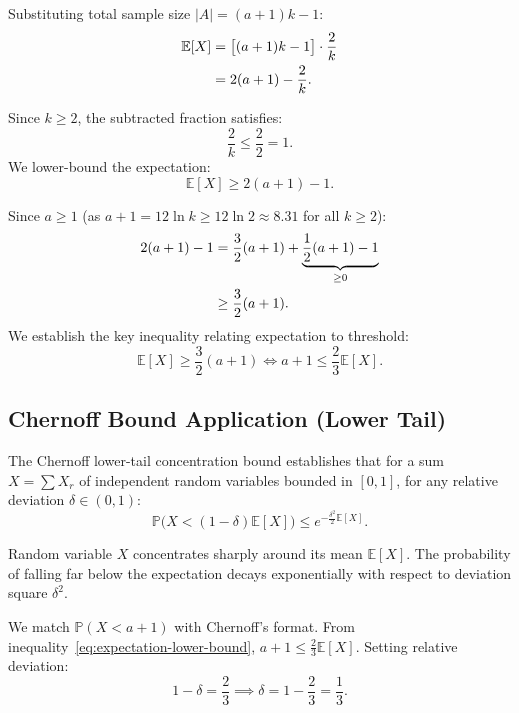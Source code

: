 Substituting total sample size $|A| = (a + 1)k - 1$:
\begin{align}
  \mathbb{E}[X] &= \big[(a + 1)k - 1\big] \cdot \frac{2}{k} \notag\\
  &= 2(a + 1) - \frac{2}{k}.
\end{align}

Since $k \ge 2$, the subtracted fraction satisfies:
\begin{equation}
  \frac{2}{k} \le \frac{2}{2} = 1.
\end{equation}
We lower-bound the expectation:
\begin{equation}
  \mathbb{E}[X] \ge 2(a + 1) - 1.
\end{equation}

Since $a \ge 1$ (as $a + 1 = 12 \ln k \ge 12 \ln 2 \approx 8.31$ for all $k \ge 2$):
\begin{align}
  2(a + 1) - 1 &= \frac{3}{2}(a + 1) + \underbrace{\frac{1}{2}(a + 1) - 1}_{\ge 0} \notag\\
  &\ge \frac{3}{2}(a + 1).
\end{align}
We establish the key inequality relating expectation to threshold:
\begin{equation}
  \mathbb{E}[X] \ge \frac{3}{2}(a + 1) \iff a + 1 \le \frac{2}{3}\mathbb{E}[X].
  \label{eq:expectation-lower-bound}
\end{equation}

\subsection{Chernoff Bound Application (Lower Tail)}
The Chernoff lower-tail concentration bound establishes that for a sum $X = \sum X_r$ of independent random variables bounded in $[0, 1]$, for any relative deviation $\delta \in (0, 1)$:
\begin{equation}
  \mathbb{P}\big(X < (1 - \delta)\mathbb{E}[X]\big) \le e^{-\frac{\delta^2}{2}\mathbb{E}[X]}.
  \label{eq:chernoff-lower-tail-theorem}
\end{equation}

\begin{property}
Random variable $X$ concentrates sharply around its mean $\mathbb{E}[X]$. The probability of falling far below the expectation decays exponentially with respect to deviation square $\delta^2$.
\end{property}

We match $\mathbb{P}(X < a + 1)$ with Chernoff's format. From inequality~\eqref{eq:expectation-lower-bound}, $a + 1 \le \frac{2}{3}\mathbb{E}[X]$. Setting relative deviation:
\begin{equation}
  1 - \delta = \frac{2}{3} \implies \delta = 1 - \frac{2}{3} = \frac{1}{3}.
\end{equation}

